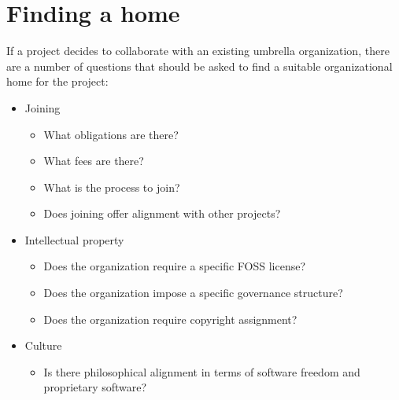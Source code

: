 


\chapter{Finding a home}

If a project decides to collaborate with an existing umbrella organization, there are a number of questions that should be asked to find a suitable organizational home for the project:

\begin{itemize}

\item Joining

\begin{itemize}

\item What obligations are there?

\item What fees are there?

\item What is the process to join?

\item Does joining offer alignment with other projects?

\end{itemize}

\item Intellectual property

\begin{itemize}

\item Does the organization require a specific FOSS license?

\item Does the organization impose a specific governance structure?

\item Does the organization require copyright assignment?

\end{itemize}

\item Culture

\begin{itemize}

\item Is there philosophical alignment in terms of software freedom and proprietary software?


\end{itemize}
\end{itemize}
